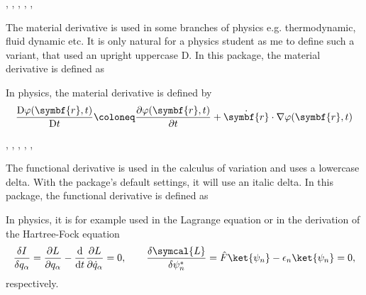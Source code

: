 	\begin{function}{\mdv}
		\begin{syntax}
			\sarg, , , \targ{/}, , 
		\end{syntax}
		The material derivative is used in some branches of physics e.g. thermodynamic, fluid dynamic etc. It is only natural for a physics student as me to define such a variant, that used an upright uppercase D. In this package, the material derivative is defined as
		
		\begin{definition}
		\end{definition}
		
		\noindent In physics, the material derivative is defined by
		\begin{equation*}
			\mdv{ \varphi(\symbf{r}, t) }{ t } \coloneq \pdv{ \varphi(\symbf{r}, t) }{ t } + \dot{\symbf{r}} \cdot \nabla \varphi(\symbf{r}, t)
		\end{equation*}
	\end{function}
	
	\begin{function}{\fdv}
		\begin{syntax}
			\sarg, , , \targ{/}, , \earg{\_, point\tsb{1}, \^, point\tsb{2}}
		\end{syntax}
		The functional derivative is used in the calculus of variation and uses a lowercase delta. With the package's default settings, it will use an italic delta. In this package, the functional derivative is defined as
		
		\begin{definition}
			\DeclareDerivative{\fdv}{\delta}%
		\end{definition}
		
		\noindent In physics, it is for example used in the Lagrange equation or in the derivation of the Hartree-Fock equation
		\begin{equation*}
			\fdv{I}{q_{\alpha}} = \pdv{L}{q_{\alpha}} - \odv*{ \pdv{L}{ \dot{q}_{\alpha} } } { t } = 0, \qquad \fdv{ \symcal{L} }{ \psi_{n}^* } = \hat{F} \ket{\psi_{n}} - \epsilon_{n} \ket{\psi_{n}} = 0
			,
		\end{equation*}
		respectively.
	\end{function}
	
